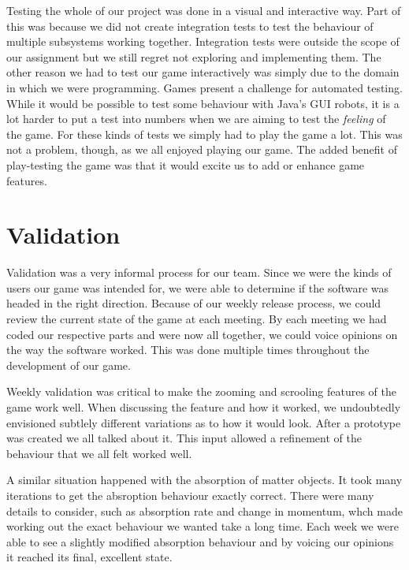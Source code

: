 Testing the whole of our project was done in a visual and interactive
way. Part of this was because we did not create integration tests to
test the behaviour of multiple subsystems working
together. Integration tests were outside the scope of our assignment
but we still regret not exploring and implementing them. The other
reason we had to test our game interactively was simply due to the
domain in which we were programming. Games present a challenge for
automated testing. While it would be possible to test some behaviour
with Java's GUI robots, it is a lot harder to put a test into numbers
when we are aiming to test the \emph{feeling} of the game. For these
kinds of tests we simply had to play the game a lot. This was not a
problem, though, as we all enjoyed playing our game. The added benefit
of play-testing the game was that it would excite us to add or enhance
game features.


%
%

\section{Validation}

Validation was a very informal process for our team. Since we were the
kinds of users our game was intended for, we were able to determine if
the software was headed in the right direction. Because of our weekly
release process, we could review the current state of the game at each
meeting. By each meeting we had coded our respective parts and were
now all together, we could voice opinions on the way the software
worked. This was done multiple times throughout the development of our
game.

Weekly validation was critical to make the zooming and scrooling
features of the game work well. When discussing the feature and how it
worked, we undoubtedly envisioned subtlely different variations as to
how it would look. After a prototype was created we all talked about
it. This input allowed a refinement of the behaviour that we all felt
worked well.

A similar situation happened with the absorption of matter objects. It
took many iterations to get the absroption behaviour exactly
correct. There were many details to consider, such as absorption rate
and change in momentum, whch made working out the exact behaviour we
wanted take a long time. Each week we were able to see a slightly
modified absorption behaviour and by voicing our opinions it reached
its final, excellent state.

